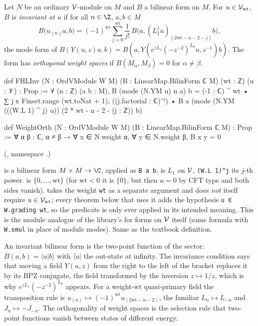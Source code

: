 \begin{definition}\label{ch09:def:FHLInv}
Let $N$ be an ordinary $\mathcal{V}$-module on $M$ and $B$ a bilinear form on $M$. For
$u\in\mathcal{V}_{\mathrm{wt}}$, $B$ is \emph{invariant at $u$} if for all $n\in\Z$, $a,b\in M$
\begin{equation}\label{ch09:eq:FHLInv}
B\big(u_{(n)}a,b\big)=(-1)^{\mathrm{wt}}\sum_{j=0}^{\mathrm{wt}}\frac1{j!}\,
B\big(a,(L_1^ju)_{(2\mathrm{wt}-n-2-j)}b\big),
\end{equation}
the mode form of $B(Y(u,z)a,b)=B(a,Y(e^{zL_1}(-z^{-2})^{L_0}u,z^{-1})b)$. The form has
\emph{orthogonal weight spaces} if $B(M_\alpha,M_\beta)=0$ for $\alpha\neq\beta$.
\end{definition}
\begin{leancode}
def FHLInv (N : OrdVModule W M) (B : LinearMap.BilinForm ℂ M) (wt : ℤ) (u : 𝒱) : Prop :=
  ∀ (n : ℤ) (a b : M), B (mode (N.YM u) n a) b
    = (-1 : ℂ) ^ wt • ∑ j ∈ Finset.range (wt.toNat + 1), ((j.factorial : ℂ)⁻¹) •
        B a (mode (N.YM (((W.L 1) ^ j) u)) (2 * wt - n - 2 - (j : ℤ)) b)

def WeightOrth (N : OrdVModule W M) (B : LinearMap.BilinForm ℂ M) : Prop :=
  ∀ α β : ℂ, α ≠ β → ∀ x ∈ N.weight α, ∀ y ∈ N.weight β, B x y = 0
\end{leancode}
(, namespace .)

\begin{dictionary}
 is a bilinear form $M\times M\to\C$, applied as \texttt{B a b}.
 is $L_1$ on $\mathcal{V}$, \texttt{(W.L 1)\^{}j} its $j$-th power.
 is $\{0,\dots,\mathrm{wt}\}$ (for $\mathrm{wt}<0$ it is
$\{0\}$, but then $u=0$ by CFT type and both sides vanish).  takes the weight
\texttt{wt} as a separate argument and does \emph{not} itself require $u\in\mathcal{V}_{\mathrm{wt}}$;
every theorem below that uses it adds the hypothesis \texttt{u ∈ W.grading wt}, so the
predicate is only ever applied in its intended meaning. This is the module analogue of the
library's  for forms on $\mathcal{V}$ itself (same formula with
\texttt{W.smul} in place of module modes). Same as the textbook definition.
\end{dictionary}

\begin{physics}
An invariant bilinear form is the two-point function of the sector: $B(a,b)=\langle a|b\rangle$ with $\langle a|$ the out-state at infinity. The invariance condition says that moving a field $Y(u,z)$ from the right to the left of the bracket replaces it by its BPZ conjugate, the field transformed by the inversion $z\mapsto1/z$, which is why $e^{zL_1}(-z^{-2})^{L_0}$ appears. For a weight-$\mathrm{wt}$ quasi-primary field the transposition rule is $u_{(n)}\mapsto(-1)^{\mathrm{wt}}u_{(2\mathrm{wt}-n-2)}$, the familiar $L_n\mapsto L_{-n}$ and $J_n\mapsto-J_{-n}$. The orthogonality of weight spaces is the selection rule that two-point functions vanish between states of different energy.
\end{physics}

